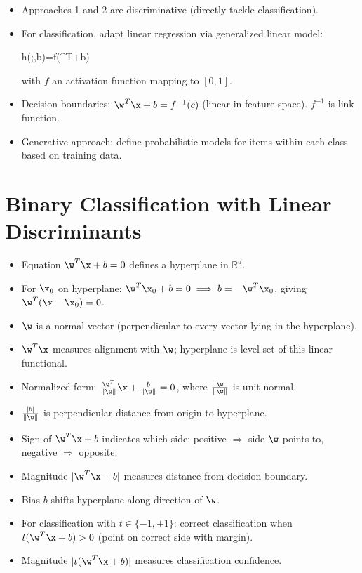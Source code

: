 \begin{itemize}
    \item Approaches 1 and 2 are \alert{discriminative} (directly tackle classification).
    \item For classification, adapt linear regression via \alert{generalized linear model}:
    \begin{myequation}
    h(\x;\w,b)=f(\w^T\x+b)
    \end{myequation}
    with $f$ an \alert{activation function} mapping to $[0,1]$.
    \item Decision boundaries: $\w^T\x+b=f^{-1}(c)$ (linear in feature space). $f^{-1}$ is \alert{link function}.
    \item Generative approach: define probabilistic models for items within each class based on training data.
\end{itemize}

\section*{Binary Classification with Linear Discriminants}

\begin{itemize}
    \item Equation $\w^T\x + b = 0$ defines a hyperplane in $\mathbb{R}^d$.
    \item For $\x_0$ on hyperplane: $\w^T\x_0 + b = 0 \implies b = -\w^T\x_0$, giving $\w^T(\x - \x_0) = 0$.
    \item $\w$ is a normal vector (perpendicular to every vector lying in the hyperplane).
    \item $\w^T\x$ measures alignment with $\w$; hyperplane is level set of this linear functional.
    \item Normalized form: $\frac{\w^T}{\|\w\|}\x + \frac{b}{\|\w\|} = 0$, where $\frac{\w}{\|\w\|}$ is unit normal.
    \item $\frac{|b|}{\|\w\|}$ is perpendicular distance from origin to hyperplane.
    \item Sign of $\w^T\x + b$ indicates which side: positive $\Rightarrow$ side $\w$ points to, negative $\Rightarrow$ opposite.
    \item Magnitude $|\w^T\x + b|$ measures distance from decision boundary.
    \item Bias $b$ shifts hyperplane along direction of $\w$.
    \item For classification with $t\in\{-1,+1\}$: correct classification when $t(\w^T\x + b) > 0$ (point on correct side with margin).
    \item Magnitude $|t(\w^T\x + b)|$ measures classification confidence.
\end{itemize}

